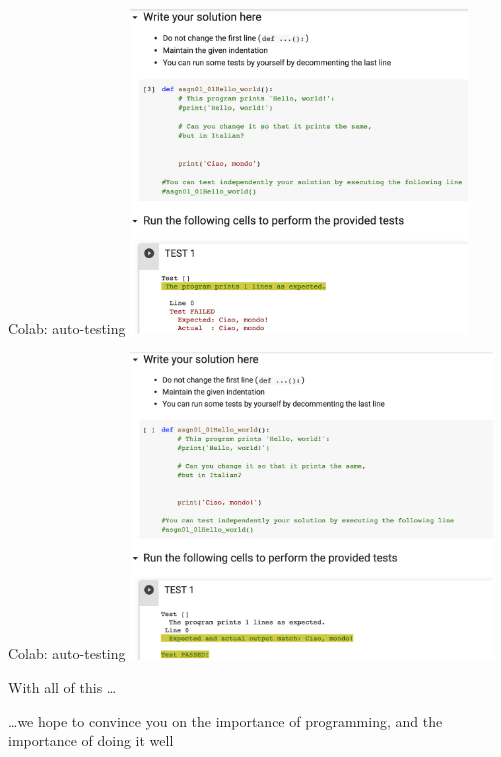 \documentclass{beamer}%
\begin{document}
\begin{frame}{Colab: auto-testing}
	\centering 
	\includegraphics[width=0.67\textwidth]{figures/colab3b}
\end{frame}

\begin{frame}{Colab: auto-testing}
	\centering 
	\includegraphics[width=0.72\textwidth]{figures/colab2}
\end{frame}

\begin{frame}{With all of this \ldots}
	\centering 
	\begin{block}{}
\ldots we hope to convince you on the importance of programming, and the importance of doing it well
	\end{block}
\end{frame}
\end{document}
